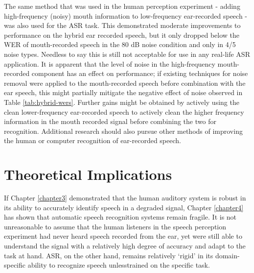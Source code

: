 The same method that was used in the human perception experiment - adding high-frequency (noisy) mouth information to low-frequency ear-recorded speech - was also used for the ASR task.  This demonstrated moderate improvements to performance on the hybrid ear recorded speech, but it only dropped below the WER of mouth-recorded speech in the 80 dB noise condition and only in 4/5 noise types.  Needless to say this is still not acceptable for use in any real-life ASR application.  It is apparent that the level of noise in the high-frequency mouth-recorded component has an effect on performance; if existing techniques for noise removal were applied to the mouth-recorded speech before combination with the ear speech, this might partially mitigate the negative effect of noise observed in Table \ref{tab:hybrid-wers}.  Further gains might be obtained by actively using the clean lower-frequency ear-recorded speech to actively clean the higher frequency information in the mouth recorded signal before combining the two for recognition.   
Additional research should also pursue other methods of improving the human or computer recognition of ear-recorded speech. 


\section{Theoretical Implications}

If Chapter \ref{chapter3} demonstrated that the human auditory system is robust in its ability to accurately identify speech in a degraded signal, Chapter \ref{chapter4} has shown that automatic speech recognition systems remain fragile.  It is not unreasonable to assume that the human listeners in the speech perception experiment had never heard speech recorded from the ear, yet were still able to understand the signal with a relatively high degree of accuracy and adapt to the task at hand.  ASR, on the other hand, remains relatively `rigid' in its domain-specific ability to recognize speech unlesstrained on the specific task.

